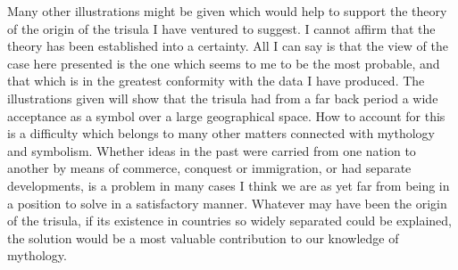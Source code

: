 \documentclass[a4paper, 11pt, oneside, english, landscape, twocolumn]{article}
\begin{document}
Many other illustrations might be given which would help to support the theory of the origin of the trisula I have ventured to suggest. I cannot affirm that the theory has been established into a certainty. All I can say is that the view of the case here presented is the one which seems to me to be the most probable, and that which is in the greatest conformity with the data I have produced. The illustrations given will show that the trisula had from a far back period a wide acceptance as a symbol over a large geographical space. How to account for this is a difficulty which belongs to many other matters connected with mythology and symbolism. Whether ideas in the past were carried from one nation to another by means of commerce, conquest or immigration, or had separate developments, is a problem in many cases I think we are as yet far from being in a position to solve in a satisfactory manner. Whatever may have been the origin of the trisula, if its existence in countries so widely separated could be explained, the solution would be a most valuable contribution to our knowledge of mythology.
\clearpage
{}
\vspace*{\fill}  
\end{document}
